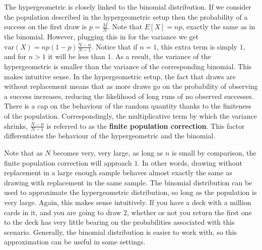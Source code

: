 \documentclass[
  letterpaper,
  DIV=11,
  numbers=noendperiod]{scrreprt}
\theoremstyle{definition}
\theoremstyle{definition}
\theoremstyle{definition}
\theoremstyle{remark}
\begin{document}
\begin{tcolorbox}[enhanced jigsaw, coltitle=black, colframe=quarto-callout-note-color-frame, colbacktitle=quarto-callout-note-color!10!white, bottomrule=.15mm, opacitybacktitle=0.6, colback=white, toptitle=1mm, arc=.35mm, leftrule=.75mm, bottomtitle=1mm, opacityback=0, breakable, rightrule=.15mm, title={The Hypergeometric Distribution, Binomial Distribution, and Survey
Sampling}, left=2mm, titlerule=0mm, toprule=.15mm]

The hypergeometric is closely linked to the binomial distribution. If we
consider the population described in the hypergeometric setup then the
probability of a success on the first draw is \(p=\frac{M}{N}\). Note
that \(E[X] = np\), exactly the same as in the binomial. However,
plugging this in for the variance we get
\(\text{var}(X) = np(1-p)\frac{N-n}{N-1}\). Notice that if \(n=1\), this
extra term is simply \(1\), and for \(n > 1\) it will be less than
\(1\). As a result, the variance of the hypergeometric is smaller than
the variance of the corresponding binomial. This makes intuitive sense.
In the hypergeometric setup, the fact that draws are without replacement
means that as more draws go on the probability of observing a success
increases, reducing the likelihood of long runs of no observed
successes. There is a cap on the behaviour of the random quantity thanks
to the finiteness of the population. Correspondingly, the multiplicative
term by which the variance shrinks, \(\frac{N-n}{N-1}\) is referred to
as the \textbf{finite population correction}. This factor differentiates
the behaviour of the hypergeometric and the binomial.

Note that as \(N\) becomes very, very large, as long as \(n\) is small
by comparison, the finite population correction will approach \(1\). In
other words, drawing without replacement in a large enough sample
behaves almost exactly the same as drawing with replacement in the same
sample. The binomial distribution can be used to approximate the
hypergeometric distribution, so long as the population is very large.
Again, this makes sense intuitively. If you have a deck with a million
cards in it, and you are going to draw \(2\), whether or not you return
the first one to the deck has very little bearing on the probabilities
associated with this scenario. Generally, the binomial distribution is
easier to work with, so this approximation can be useful in some
settings.


\end{tcolorbox}
\end{document}
